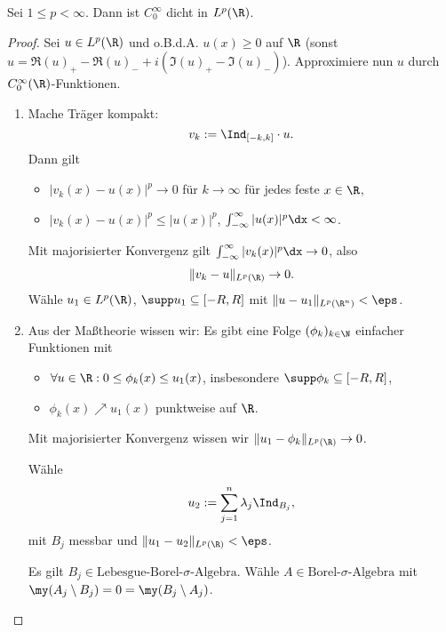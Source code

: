 \begin{st} \label{4.18}
	Sei $1 \le p < \infty$.
	Dann ist $C_0^\infty$ dicht in $L^p(\R)$.
	\begin{proof}
		Sei $u \in L^p(\R)$ und o.B.d.A. $u(x) \ge 0$ auf $\R$ (sonst $u = \Re(u)_+ - \Re(u)_- + i(\Im(u)_+ - \Im(u)_-)$).
		Approximiere nun $u$ durch $C_0^\infty(\R)$-Funktionen.
		\begin{enumerate}[1)]
			\item
				Mache Träger kompakt:
				\[
					v_k := \Ind_{[-k,k]}\cdot u.
				\]
				Dann gilt
				\begin{itemize}
					\item
						$|v_k(x)-u(x)|^p \to 0$ für $k\to \infty$ für jedes feste $x \in \R$,
					\item
						$|v_k(x)-u(x)|^p \le |u(x)|^p$, $\int_{-\infty}^\infty |u(x)|^p \dx < \infty$.
				\end{itemize}
				Mit majorisierter Konvergenz gilt $\int_{-\infty}^\infty |v_k(x)|^p \dx \to 0$, also
				\[
					\|v_k - u\|_{L^p(\R)} \to 0.
				\]
				Wähle $u_1 \in L^p(\R)$, $\supp u_1 \subset [-R,R]$ mit $\|u-u_1\|_{L^p(\R^n)} < \eps$.
			\item
				Aus der Maßtheorie wissen wir: Es gibt eine Folge $(\phi_k)_{k\in \N}$ einfacher Funktionen mit
				\begin{itemize}
					\item
						$\forall u \in \R : 0 \le \phi_k(x) \le u_1(x)$, insbesondere $\supp \phi_k \subset [-R,R]$,
					\item
						$\phi_k(x) \nearrow u_1(x)$ punktweise auf $\R$.
				\end{itemize}
				Mit majorisierter Konvergenz wissen wir $\|u_1 - \phi_k\|_{L^p(\R)} \to 0$.

				Wähle
				\[
					u_2 := \sum_{j=1}^n \lambda_j \Ind_{B_j},
				\]
				mit $B_j$ messbar und $\|u_1-u_2\|_{L^p(\R)} < \eps$.

				Es gilt $B_j \in \text{Lebesgue-Borel-$\sigma$-Algebra}$.
				Wähle $A \in \text{Borel-$\sigma$-Algebra}$ mit $\my(A_j \setminus B_j) = 0 = \my(B_j \setminus A_j)$.


\end{enumerate}
\end{proof}
\end{st}

